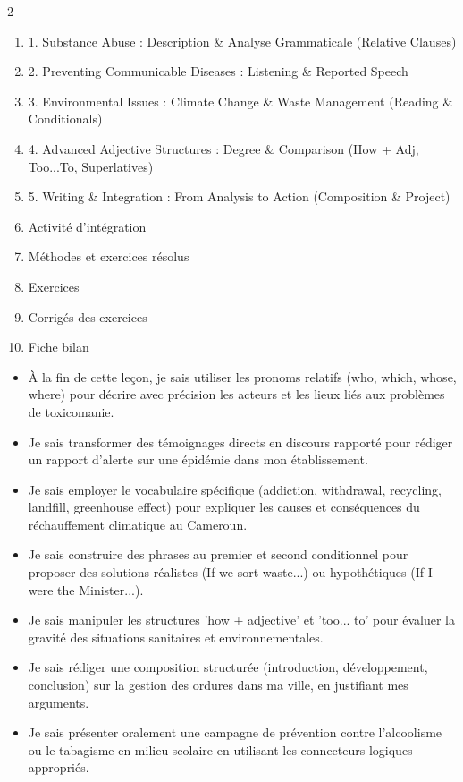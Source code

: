 \documentclass[11pt]{article}
\begin{document}
\begin{sommaire}
\begin{multicols}{2}
\begin{enumerate}
\item 1. Substance Abuse : Description \& Analyse Grammaticale (Relative Clauses)
\item 2. Preventing Communicable Diseases : Listening \& Reported Speech
\item 3. Environmental Issues : Climate Change \& Waste Management (Reading \& Conditionals)
\item 4. Advanced Adjective Structures : Degree \& Comparison (How + Adj, Too...To, Superlatives)
\item 5. Writing \& Integration : From Analysis to Action (Composition \& Project)
\item Activité d'intégration
\item Méthodes et exercices résolus
\item Exercices
\item Corrigés des exercices
\item Fiche bilan
\end{enumerate}
\end{multicols}
\end{sommaire}

\begin{objectifs}
\begin{itemize}
\item À la fin de cette leçon, je sais utiliser les pronoms relatifs (who, which, whose, where) pour décrire avec précision les acteurs et les lieux liés aux problèmes de toxicomanie.
\item Je sais transformer des témoignages directs en discours rapporté pour rédiger un rapport d'alerte sur une épidémie dans mon établissement.
\item Je sais employer le vocabulaire spécifique (addiction, withdrawal, recycling, landfill, greenhouse effect) pour expliquer les causes et conséquences du réchauffement climatique au Cameroun.
\item Je sais construire des phrases au premier et second conditionnel pour proposer des solutions réalistes (If we sort waste...) ou hypothétiques (If I were the Minister...).
\item Je sais manipuler les structures 'how + adjective' et 'too... to' pour évaluer la gravité des situations sanitaires et environnementales.
\item Je sais rédiger une composition structurée (introduction, développement, conclusion) sur la gestion des ordures dans ma ville, en justifiant mes arguments.
\item Je sais présenter oralement une campagne de prévention contre l'alcoolisme ou le tabagisme en milieu scolaire en utilisant les connecteurs logiques appropriés.
\end{itemize}
\end{objectifs}
\end{document}
